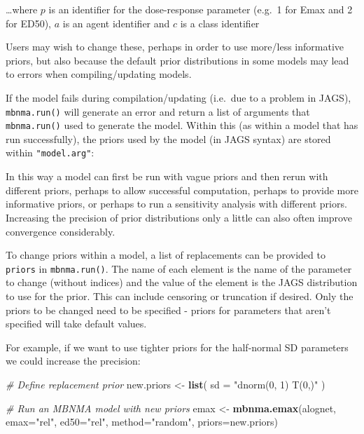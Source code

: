 \documentclass[]{article}
\newenvironment{Shaded}{\begin{snugshade}}{\end{snugshade}}
\newcommand{\CommentTok}[1]{\textcolor[rgb]{0.56,0.35,0.01}{\textit{#1}}}
\newcommand{\DataTypeTok}[1]{\textcolor[rgb]{0.13,0.29,0.53}{#1}}
\newcommand{\KeywordTok}[1]{\textcolor[rgb]{0.13,0.29,0.53}{\textbf{#1}}}
\newcommand{\NormalTok}[1]{#1}
\newcommand{\OperatorTok}[1]{\textcolor[rgb]{0.81,0.36,0.00}{\textbf{#1}}}
\newcommand{\StringTok}[1]{\textcolor[rgb]{0.31,0.60,0.02}{#1}}
\begin{document}
\ldots where \(p\) is an identifier for the dose-response parameter
(e.g.~1 for Emax and 2 for ED50), \(a\) is an agent identifier and \(c\)
is a class identifier

Users may wish to change these, perhaps in order to use more/less
informative priors, but also because the default prior distributions in
some models may lead to errors when compiling/updating models.

If the model fails during compilation/updating (i.e.~due to a problem in
JAGS), \texttt{mbnma.run()} will generate an error and return a list of
arguments that \texttt{mbnma.run()} used to generate the model. Within
this (as within a model that has run successfully), the priors used by
the model (in JAGS syntax) are stored within \texttt{"model.arg"}:

\begin{Shaded}
\end{Shaded}

In this way a model can first be run with vague priors and then rerun
with different priors, perhaps to allow successful computation, perhaps
to provide more informative priors, or perhaps to run a sensitivity
analysis with different priors. Increasing the precision of prior
distributions only a little can also often improve convergence
considerably.

To change priors within a model, a list of replacements can be provided
to \texttt{priors} in \texttt{mbnma.run()}. The name of each element is
the name of the parameter to change (without indices) and the value of
the element is the JAGS distribution to use for the prior. This can
include censoring or truncation if desired. Only the priors to be
changed need to be specified - priors for parameters that aren't
specified will take default values.

For example, if we want to use tighter priors for the half-normal SD
parameters we could increase the precision:

\begin{Shaded}
\begin{Highlighting}[]
\CommentTok{# Define replacement prior}
\NormalTok{new.priors <-}\StringTok{ }\KeywordTok{list}\NormalTok{(}
  \DataTypeTok{sd =} \StringTok{"dnorm(0, 1) T(0,)"}
\NormalTok{  )}

\CommentTok{# Run an MBNMA model with new priors}
\NormalTok{emax <-}\StringTok{ }\KeywordTok{mbnma.emax}\NormalTok{(alognet, }\DataTypeTok{emax=}\StringTok{"rel"}\NormalTok{, }\DataTypeTok{ed50=}\StringTok{"rel"}\NormalTok{, }\DataTypeTok{method=}\StringTok{"random"}\NormalTok{,}
                   \DataTypeTok{priors=}\NormalTok{new.priors)}
\end{Highlighting}
\end{Shaded}
\end{document}
